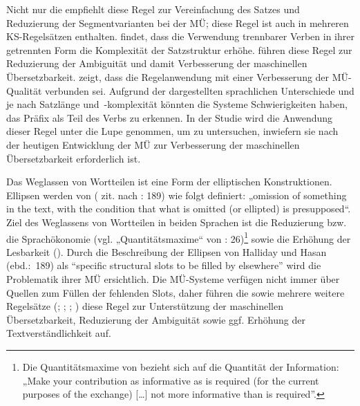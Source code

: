 Nicht nur die \citet[111]{tekom2013} empfiehlt diese Regel zur Vereinfachung des Satzes und Reduzierung der Segmentvarianten bei der MÜ; diese Regel ist auch in mehreren KS-Regelsätzen enthalten. \citet{Siegel2011} findet, dass die Verwendung trennbarer Verben in ihrer getrennten Form die Komplexität der Satzstruktur erhöhe. \citet{BernthGdaniec2001} führen diese Regel zur Reduzierung der Ambiguität und damit Verbesserung der maschinellen Übersetzbarkeit. \citet{Siegel2013} zeigt, dass die Regelanwendung mit einer Verbesserung der MÜ-Qualität verbunden sei. Aufgrund der dargestellten sprachlichen Unterschiede und je nach Satzlänge und~-komplexität könnten die Systeme Schwierigkeiten haben, das Präfix als Teil des Verbs zu erkennen. In der Studie wird die Anwendung dieser Regel unter die Lupe genommen, um zu untersuchen, inwiefern sie nach der heutigen Entwicklung der MÜ zur Verbesserung der maschinellen Übersetzbarkeit erforderlich ist.

Das Weglassen von Wortteilen ist eine Form der elliptischen Konstruktionen. Ellipsen werden von \citeauthor{HallidayHasan1976} (\citeyear{HallidayHasan1976} zit. nach \citealt{BernthGdaniec2001}: 189) wie folgt definiert: „omission of something in the text, with the condition that what is omitted (or ellipted) is presupposed“. Ziel des Weglassens von Wortteilen in beiden Sprachen ist die Reduzierung bzw. die Sprachökonomie (vgl. „Quantitätsmaxime“ von \citealt{Grice1975}: 26)\footnote{{{{Die Quantitätsmaxime von \citet[26]{Grice1975} bezieht sich auf die Quantität der Information: „Make your contribution as informative as is required (for the current purposes of the exchange) [\ldots] not more informative than is required”.}}}} sowie die Erhöhung der Lesbarkeit (\citealt{BernthGdaniec2001}). Durch die Beschreibung der Ellipsen von Halliday und Hasan (ebd.:~189) als “specific structural slots to be filled by elsewhere” wird die Problematik ihrer MÜ ersichtlich. Die MÜ-Systeme verfügen nicht immer über Quellen zum Füllen der fehlenden Slots, daher führen die \citet[68]{tekom2013} sowie mehrere weitere Regelsätze (\citealt{BernthGdaniec2001}; \citealt{Reuther2003}; \citealt{Siegel2011}; \citealt{Congree2018}) diese Regel zur Unterstützung der maschinellen Übersetzbarkeit, Reduzierung der Ambiguität sowie ggf. Erhöhung der Textverständlichkeit auf.

